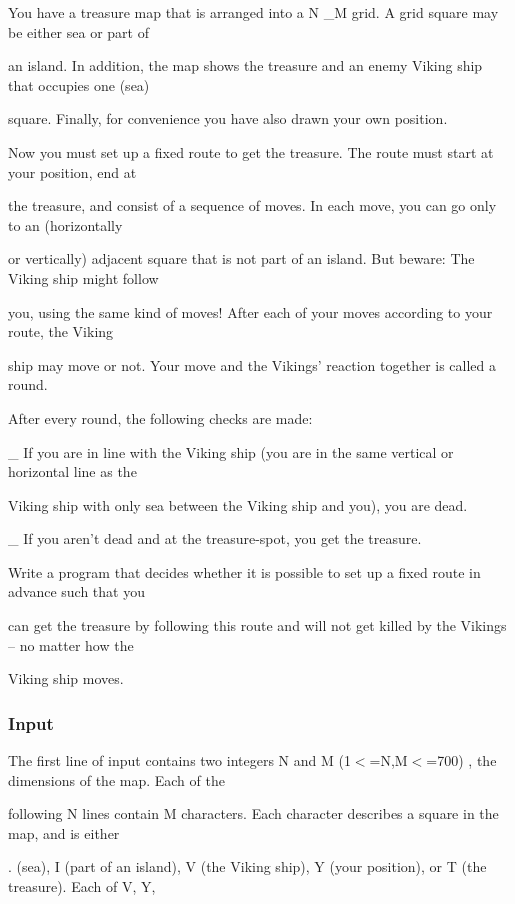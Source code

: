 

You have a treasure map that is arranged into a N \_M grid. A grid square may be either sea or part of

an island. In addition, the map shows the treasure and an enemy Viking ship that occupies one (sea)

square. Finally, for convenience you have also drawn your own position.

Now you must set up a fixed route to get the treasure. The route must start at your position, end at

the treasure, and consist of a sequence of moves. In each move, you can go only to an (horizontally

or vertically) adjacent square that is not part of an island. But beware: The Viking ship might follow

you, using the same kind of moves! After each of your moves according to your route, the Viking

ship may move or not. Your move and the Vikings’ reaction together is called a round.

After every round, the following checks are made:

\_ If you are in line with the Viking ship (you are in the same vertical or horizontal line as the

Viking ship with only sea between the Viking ship and you), you are dead.

\_ If you aren’t dead and at the treasure-spot, you get the treasure.

Write a program that decides whether it is possible to set up a fixed route in advance such that you

can get the treasure by following this route and will not get killed by the Vikings – no matter how the

Viking ship moves.

\subsubsection{Input}

The first line of input contains two integers N and M (1$<$=N,M$<$=700) , the dimensions of the map. Each of the

following N lines contain M characters. Each character describes a square in the map, and is either

. (sea), I (part of an island), V (the Viking ship), Y (your position), or T (the treasure). Each of V, Y,

